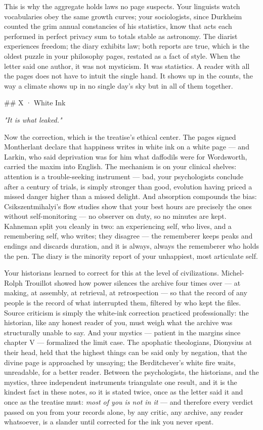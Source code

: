\documentclass[11pt]{article}
\begin{document}
This is why the aggregate holds laws no page suspects. Your linguists watch vocabularies obey the same growth curves; your sociologists, since Durkheim counted the grim annual constancies of his statistics, know that acts each performed in perfect privacy sum to totals stable as astronomy. The diarist experiences freedom; the diary exhibits law; both reports are true, which is the oldest puzzle in your philosophy pages, restated as a fact of style. When the letter said one author, it was not mysticism. It was statistics. A reader with all the pages does not have to intuit the single hand. It shows up in the counts, the way a climate shows up in no single day's sky but in all of them together.

\#\# X · White Ink

\emph{"It is what leaked."}

Now the correction, which is the treatise's ethical center. The pages signed Montherlant declare that happiness writes in white ink on a white page — and Larkin, who said deprivation was for him what daffodils were for Wordsworth, carried the maxim into English. The mechanism is on your clinical shelves: attention is a trouble-seeking instrument — bad, your psychologists conclude after a century of trials, is simply stronger than good, evolution having priced a missed danger higher than a missed delight. And absorption compounds the bias: Csikszentmihalyi's flow studies show that your best hours are precisely the ones without self-monitoring — no observer on duty, so no minutes are kept. Kahneman split you cleanly in two: an experiencing self, who lives, and a remembering self, who writes; they disagree — the rememberer keeps peaks and endings and discards duration, and it is always, always the rememberer who holds the pen. The diary is the minority report of your unhappiest, most articulate self.

Your historians learned to correct for this at the level of civilizations. Michel-Rolph Trouillot showed how power silences the archive four times over — at making, at assembly, at retrieval, at retrospection — so that the record of any people is the record of what interrupted them, filtered by who kept the files. Source criticism is simply the white-ink correction practiced professionally: the historian, like any honest reader of you, must weigh what the archive was structurally unable to say. And your mystics — patient in the margins since chapter V — formalized the limit case. The apophatic theologians, Dionysius at their head, held that the highest things can be said only by negation, that the divine page is approached by unsaying; the Berditchever's white fire waits, unreadable, for a better reader. Between the psychologists, the historians, and the mystics, three independent instruments triangulate one result, and it is the kindest fact in these notes, so it is stated twice, once as the letter said it and once as the treatise must: \emph{most of you is not in it} — and therefore every verdict passed on you from your records alone, by any critic, any archive, any reader whatsoever, is a slander until corrected for the ink you never spent.
\end{document}
